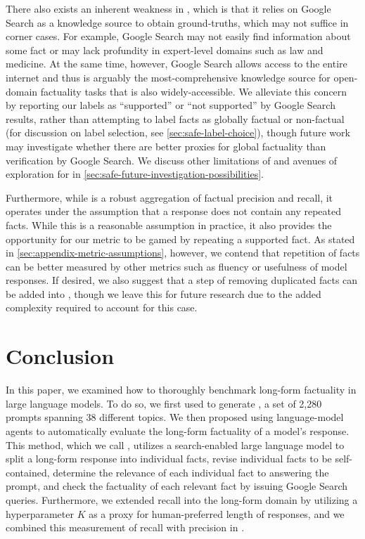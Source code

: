 \documentclass{article}
\theoremstyle{plain}
\theoremstyle{definition}
\theoremstyle{remark}
\begin{document}
There also exists an inherent weakness in \safe{}, which is that it relies on Google Search as a knowledge source to obtain ground-truths, which may not suffice in corner cases.
For example, Google Search may not easily find information about some fact or may lack profundity in expert-level domains such as law and medicine.
At the same time, however, Google Search allows access to the entire internet and thus is arguably the most-comprehensive knowledge source for open-domain factuality tasks that is also widely-accessible.
We alleviate this concern by reporting our labels as ``supported'' or ``not supported'' by Google Search results, rather than attempting to label facts as globally factual or non-factual (for discussion on label selection, see \cref{sec:safe-label-choice}), though future work may investigate whether there are better proxies for global factuality than verification by Google Search.
We discuss other limitations of and avenues of exploration for \safe{} in \cref{sec:safe-future-investigation-possibilities}.

Furthermore, while \metric{} is a robust aggregation of factual precision and recall, it operates under the assumption that a response does not contain any repeated facts.
While this is a reasonable assumption in practice, it also provides the opportunity for our metric to be gamed by repeating a supported fact.
As stated in \cref{sec:appendix-metric-assumptions}, however, we contend that repetition of facts can be better measured by other metrics such as fluency or usefulness of model responses.
If desired, we also suggest that a step of removing duplicated facts can be added into \safe{}, though we leave this for future research due to the added complexity required to account for this case.

\section{Conclusion}
\label{sec:conclusion}

In this paper, we examined how to thoroughly benchmark long-form factuality in large language models.
To do so, we first used \gptfour{} to generate \longfact{}, a set of 2,280 prompts spanning 38 different topics.
We then proposed using language-model agents to automatically evaluate the long-form factuality of a model's response.
This method, which we call \safe{}, utilizes a search-enabled large language model to split a long-form response into individual facts, revise individual facts to be self-contained, determine the relevance of each individual fact to answering the prompt, and check the factuality of each relevant fact by issuing Google Search queries.
Furthermore, we extended recall into the long-form domain by utilizing a hyperparameter $K$ as a proxy for human-preferred length of responses, and we combined this measurement of recall with precision in \metric{}.
\end{document}
